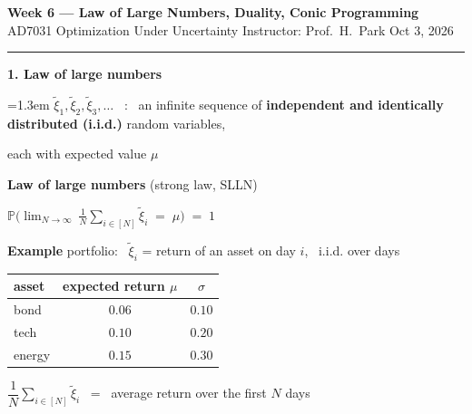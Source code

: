 \documentclass[10pt]{article}
\newcommand{\beat}[2]{%
  \par\bigskip\vspace{4pt}
  {\color{ruleink}\rule{\textwidth}{1pt}}\par\nobreak\vspace{4pt}
  {\large\bfseries #1.\; #2}\par\nobreak\vspace{6pt}}
\newenvironment{board}{%
  \par\vspace{4pt}
  \begingroup\leftskip=1.3em\relax\parskip=2pt\relax}{%
  \par\endgroup\vspace{4pt}}
\begin{document}
{\Large\bfseries Week 6 --- Law of Large Numbers, Duality, Conic Programming}\\[2pt]
{\small AD7031 Optimization Under Uncertainty \quad\textbullet\quad Instructor: Prof.\ H.\ Park \quad\textbullet\quad Oct 3, 2026}

\beat{1}{Law of large numbers}
\begin{board}
$\tilde\xi_1, \tilde\xi_2, \tilde\xi_3, \dots$ \ : \ an infinite sequence of \textbf{independent and identically
distributed (i.i.d.)} random variables,
\vspace{3pt}

\quad each with expected value $\mu$
\vspace{16pt}

\textbf{Law of large numbers} \quad (strong law, SLLN)
\vspace{4pt}

\begin{center}
$\displaystyle \mathbb{P}\Big( \lim_{N \to \infty}\ \frac{1}{N} \sum_{i \in [N]} \tilde\xi_i \;=\; \mu \Big) \;=\; 1$
\end{center}
\vspace{2pt}

\hspace{5.0cm}{sample average \ $\longrightarrow$ \ expected value}
\vspace{14pt}

\textbf{Example} \quad portfolio: \ $\tilde\xi_i$ = return of an asset on day $i$, \ i.i.d. over days
\vspace{6pt}

\begin{center}
\begin{tabular}{@{}l|c|c@{}}
 asset  & expected return $\mu$ & $\sigma$ \\ \hline
 \rule{0pt}{2.6ex}bond   & $0.06$ & $0.10$ \\
 tech   & $0.10$ & $0.20$ \\
 energy & $0.15$ & $0.30$ \\
\end{tabular}
\end{center}
\vspace{6pt}

\quad $\dfrac{1}{N} \displaystyle\sum_{i \in [N]} \tilde\xi_i$ \ = \ average return over the first $N$ days
\vspace{10pt}


\end{board}
\end{document}
